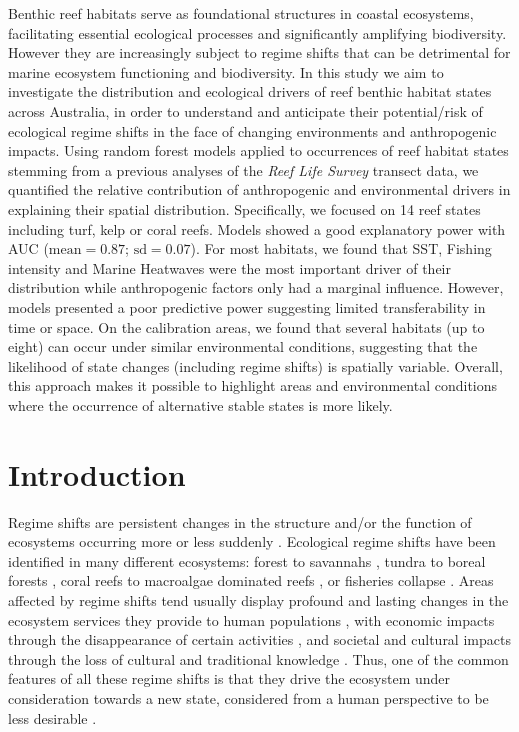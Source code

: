 \begin{refsection}
Benthic reef habitats serve as foundational structures in coastal
ecosystems, facilitating essential ecological processes and
significantly amplifying biodiversity. However they are increasingly
subject to regime shifts that can be detrimental for marine ecosystem
functioning and biodiversity. In this study we aim to investigate the
distribution and ecological drivers of reef benthic habitat states
across Australia, in order to understand and anticipate their
potential/risk of ecological regime shifts in the face of changing
environments and anthropogenic impacts. Using random forest models
applied to occurrences of reef habitat states stemming from a previous
analyses of the \emph{Reef Life Survey} transect data, we quantified the
relative contribution of anthropogenic and environmental drivers in
explaining their spatial distribution. Specifically, we focused on 14
reef states including turf, kelp or coral reefs. Models showed a good
explanatory power with AUC (\(\text{mean} = 0.87\);
\(\text{sd} = 0.07\)). For most habitats, we found that SST, Fishing
intensity and Marine Heatwaves were the most important driver of their
distribution while anthropogenic factors only had a marginal influence.
However, models presented a poor predictive power suggesting limited
transferability in time or space. On the calibration areas, we found
that several habitats (up to eight) can occur under similar
environmental conditions, suggesting that the likelihood of state
changes (including regime shifts) is spatially variable. Overall, this
approach makes it possible to highlight areas and environmental
conditions where the occurrence of alternative stable states is more
likely.

\clearpage

\hypertarget{intro-chapt3}{%
\section{Introduction}\label{intro-chapt3}}

Regime shifts are persistent changes in the structure and/or the
function of ecosystems occurring more or less suddenly \autocites[
]{Scheffer_2001}{Scheffer_2003}. Ecological regime shifts have been
identified in many different ecosystems: forest to savannahs
\autocite{Staver_2011}, tundra to boreal forests
\autocite{Scheffer_2012}, coral reefs to macroalgae dominated reefs
\autocite{McManus_2004}, or fisheries collapse \autocite{Gardmark_2015}.
Areas affected by regime shifts tend usually display profound and
lasting changes in the ecosystem services they provide to human
populations \autocite{Rocha_2015a}, with economic impacts through the
disappearance of certain activities \autocite{Crepin_2012}, and societal
and cultural impacts through the loss of cultural and traditional
knowledge \autocite{Mustonen_2021}. Thus, one of the common features of
all these regime shifts is that they drive the ecosystem under
consideration towards a new state, considered from a human perspective
to be less desirable \autocite{Scheffer_2009bk}.


\end{refsection}
